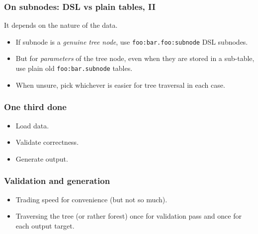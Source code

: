 \documentclass[handout]{beamer}
\begin{document}
\begin{frame}[fragile]

\frametitle{On subnodes: DSL vs plain tables, II}

It depends on the nature of the data.
\pause

\begin{itemize}
\item If subnode is a \emph{genuine tree node},
      use \verb|foo:bar.foo:subnode| DSL subnodes.
\pause
\item But for \emph{parameters} of the tree node,
      even when they are stored in a sub-table,
      use plain old \verb|foo:bar.subnode| tables.
\pause
\item When unsure, pick whichever is easier for tree traversal
      in each case.
\end{itemize}

\end{frame}


\begin{frame}

\frametitle{One third done}

\begin{itemize}
\item[\checkmark] Load data.
\item Validate correctness.
\item Generate output.
\end{itemize}

\end{frame}


\begin{frame}

\frametitle{Validation and generation}

\begin{itemize}
\item Trading speed for convenience (but not so much).
\item Traversing the tree (or rather forest) once for validation pass
      and once for each output target.
\end{itemize}

\end{frame}

\end{document}
